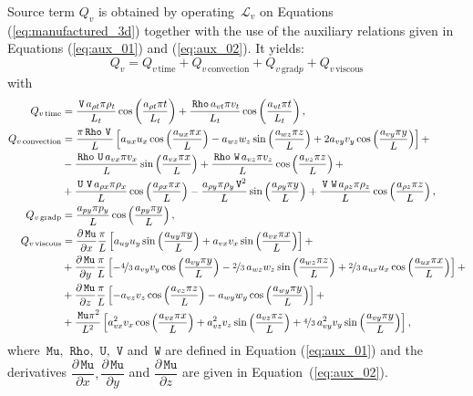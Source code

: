 \documentclass[10pt]{article}
\newcommand{\diff}[2] {\dfrac{\partial #1}{\partial #2}}
\newcommand{\Rho}{\,\mathtt{Rho}}
\newcommand{\U}{\,\mathtt{U}}
\newcommand{\V}{\,\mathtt{V}}
\newcommand{\W}{\,\mathtt{W}}
\newcommand{\Lo}{\,\mathcal{L}}
\newcommand{\Mu}{\,\mathtt{Mu}}
\newcommand{\DMuDx}{\diff{\Mu}{x}}
\newcommand{\DMuDy}{\diff{\Mu}{y}}
\newcommand{\DMuDz}{\diff{\Mu}{z}}
\newcommand{\convection}{\text{convection}}
\newcommand{\gradp}{\text{grad}p}
\newcommand{\viscous}{\text{viscous}}
\begin{document}
Source term $Q_v$ is obtained by operating $\Lo_{v}$ on Equations  (\ref{eq:manufactured_3d}) together with the use of the  auxiliary relations given in Equations (\ref{eq:aux_01}) and (\ref{eq:aux_02}). It yields:
\begin{equation*}
 \label{eq:ns1d_12}
Q_v = Q_{v \, \text{time}}+Q_{v \, \convection}+Q_{v \, \gradp }+Q_{v \, \viscous }
\end{equation*}
with
%
\begin{equation*}
 \begin{split}
 Q_{v \, \text{time}}&= \frac{\V \, a_{\rho t} \pi \rho_{t} }{L_t} \cos\left(\frac{a_{\rho t} \pi t}{L_t}\right)+ \frac{ \Rho \, a_{vt}\pi v_{t} }{L_t}\cos\left(\frac{a_{vt} \pi t}{L_t}\right) ,\\
%
 Q_{v \, \text{convection}}&= 
\frac{\pi \Rho \, \V \, }{L} \left[a_{ux} u_{x} \cos\left(\frac{a_{ux} \pi x}{L}\right) - a_{wz} w_{z} \sin\left(\frac{a_{wz} \pi z}{L}\right) + 2 a_{vy} v_{y} \cos\left(\frac{a_{vy} \pi y}{L}\right)\right]+ \\ 
&- \frac{\Rho \, \U \, a_{vx} \pi v_{x} }{L}\sin\left(\frac{a_{vx} \pi x}{L}\right) + \frac{\Rho \, \W \, a_{vz} \pi v_{z} }{L} \cos\left(\frac{a_{vz} \pi z}{L}\right)+ \\ 
&+ \frac{\U \, \V \, a_{\rho x} \pi \rho_{x} }{L}\cos\left(\frac{a_{\rho x} \pi x}{L}\right) - \frac{a_{\rho y} \pi \rho_{y} \V^{2} }{L} \sin\left(\frac{a_{\rho y} \pi y}{L}\right)+ \frac{\V \, \W \, a_{\rho z} \pi \rho_{z} }{L}\cos\left(\frac{a_{\rho z} \pi z}{L}\right) ,\\
%
 Q_{v \, \text{gradp}}&= \frac{a_{py} \pi p_{y} }{L}\cos\left(\frac{a_{py} \pi y}{L}\right),\\
%
 Q_{v \, \text{viscous}}&= 
\DMuDx\frac{\pi }{L} \left[a_{uy} u_{y} \sin\left(\frac{a_{uy} \pi y}{L}\right) + a_{vx} v_{x} \sin\left(\frac{a_{vx} \pi x}{L}\right)\right] + \\ 
&+ \DMuDy\frac{\pi }{L} \left[- \nicefrac{4}{3} \, a_{vy} v_{y} \cos\left(\frac{a_{vy} \pi y}{L}\right) - \nicefrac{2}{3} \, a_{wz} w_{z} \sin\left(\frac{a_{wz} \pi z}{L}\right) + \nicefrac{2}{3} \, a_{ux} u_{x} \cos\left(\frac{a_{ux} \pi x}{L}\right)\right] + \\ 
&+ \DMuDz\frac{\pi }{L} \left[- a_{vz} v_{z} \cos\left(\frac{a_{vz} \pi z}{L}\right) - a_{wy} w_{y} \cos\left(\frac{a_{wy} \pi y}{L}\right)\right] + \\ 
&+ \frac{\Mu \pi^{2} }{L^2} \left[a_{vx}^{2} v_{x} \cos\left(\frac{a_{vx} \pi x}{L}\right) + a_{vz}^{2} v_{z} \sin\left(\frac{a_{vz} \pi z}{L}\right) + \nicefrac{4}{3} \, a_{vy}^{2} v_{y} \sin\left(\frac{a_{vy} \pi y}{L}\right)\right],
 \end{split}
\end{equation*}
where $\Mu,\, \Rho,\,\U,\,\V$ and $\W$  are defined in Equation (\ref{eq:aux_01}) and the derivatives $\DMuDx,\DMuDy$ and $\DMuDz$ are given in Equation~(\ref{eq:aux_02}).
\end{document}
